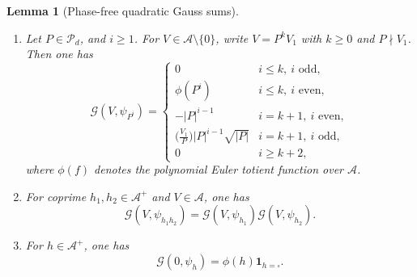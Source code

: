 \documentclass[a4paper,reqno]{amsart}
\numberwithin{equation}{section}
\newtheorem{lemma}[theorem]{Lemma}
\theoremstyle{remark}
\theoremstyle{definition}
\newcommand{\A}{\mathcal{A}}
\newcommand{\Gc}{\mathcal{G}}
\begin{document}
\begin{lemma}[Phase-free quadratic Gauss sums]\label{lem:Gc-values} 
\begin{enumerate}[label=\textup{(\arabic*)}]
\item
Let $P\in\mathcal{P}_{d}$, and $i\ge1$.
For $V\in\A\setminus\{0\}$, write $V=P^k V_1$ with $k\ge0$ and $P\nmid V_1$. Then one has
\begin{equation}\label{eq:Gc-values}
\Gc(V,\psi_{P^i})
=\begin{cases}
0& i\le k,\ i\text{ odd},\\
\phi(P^i)& i\le k,\ i\text{ even},\\
-|P|^{i-1}& i=k+1,\ i\text{ even},\\
\bigl(\frac{V_1}{P}\bigr)|P|^{i-1}\sqrt{|P|}& i=k+1,\ i\text{ odd},\\
0& i\ge k+2,
\end{cases}
\end{equation}
where $\phi(f)$ denotes the polynomial Euler totient function over $\A$.

\item
For coprime $h_1,h_2\in\A^+$ and $V\in\A$, one has
\begin{equation}\label{eq:Gc-mult}
\Gc(V,\psi_{h_1h_2})=\Gc(V,\psi_{h_1})\Gc(V,\psi_{h_2}).
\end{equation}

\item
For $h\in\A^+$, one has
\begin{equation}\label{eq:Gc-zero}
\Gc(0,\psi_h)=\phi(h)\mathbf 1_{h=\square}.
\end{equation}
\end{enumerate}
\end{lemma}
\end{document}
